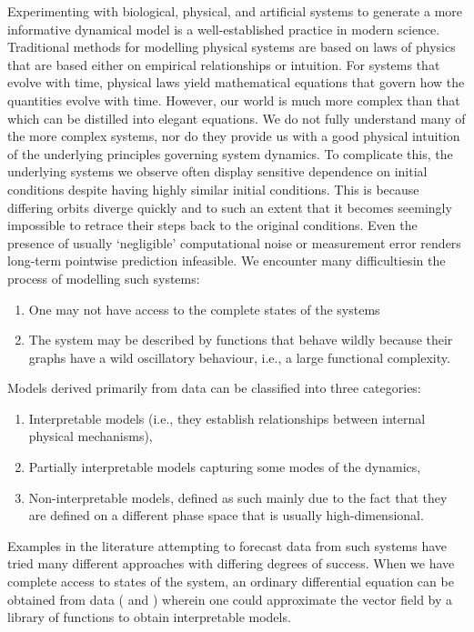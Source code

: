 Experimenting with biological, physical, and artificial systems to generate a more informative dynamical model is a well-established practice in modern science. Traditional methods for modelling physical systems are based on laws of physics that are based either on empirical relationships or intuition. For systems that evolve with time, physical laws yield mathematical equations that govern how the quantities evolve with time. However, our world is much more complex than that which can be distilled into elegant equations. We do not fully understand many of the more complex systems, nor do they provide us with a good physical intuition of the underlying principles governing system dynamics. To complicate this, the underlying systems we observe often display sensitive dependence on initial conditions despite having highly similar initial conditions. This is because differing orbits diverge quickly and to such an extent that it becomes seemingly impossible to retrace their steps back to the original conditions. Even the presence of usually `negligible' computational noise or measurement error renders long-term pointwise prediction infeasible. We encounter many difficultiesin the process of modelling such systems:
\vspace{-8mm}
\begin{enumerate}[noitemsep, label=\roman*.]
  \item One may not have access to the complete states of the systems
  \item The system may be described by functions that behave wildly because their graphs have a wild oscillatory behaviour, i.e., a large functional complexity.
\end{enumerate}


Models derived primarily from data can be classified into three categories: 
\vspace{-8mm}
\begin{enumerate}[noitemsep, label=\roman*.]
  \item  Interpretable models (i.e., they establish relationships between internal physical mechanisms), 
  \item Partially interpretable models capturing some modes of the dynamics, 
  \item Non-interpretable models, defined as such mainly due to the fact that they are defined on a different phase space that is usually high-dimensional. 
\end{enumerate}

Examples in the literature attempting to forecast data from such systems have tried many different approaches with differing degrees of success. 
When we have complete access to states of the system, an ordinary differential equation can be obtained from data (\cite{brunton2016discovering, champion2019data} and \cite{small2002modeling,xu2006modeling}) wherein one could approximate the vector field by a library of functions to obtain interpretable models. 



